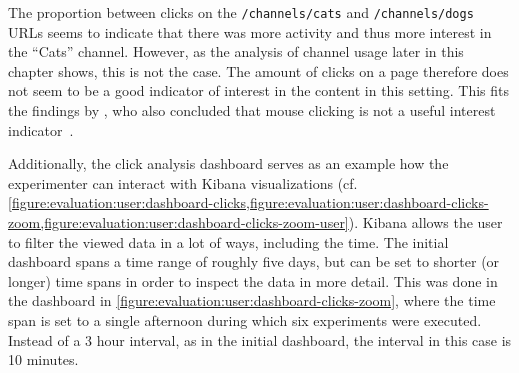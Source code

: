 The proportion between clicks on the \texttt{/channels/cats} and \texttt{/channels/dogs} URLs seems to indicate that there was more activity and thus more interest in the ``Cats'' channel.
However, as the analysis of channel usage later in this chapter shows, this is not the case.
The amount of clicks on a page therefore does not seem to be a good indicator of interest in the content in this setting.
This fits the findings by \cite{Claypool2001}, who also concluded that mouse clicking is not a useful interest indicator~\cite{Claypool2001}.

Additionally, the click analysis dashboard serves as an example how the experimenter can interact with Kibana visualizations (cf. \cref{figure:evaluation:user:dashboard-clicks,figure:evaluation:user:dashboard-clicks-zoom,figure:evaluation:user:dashboard-clicks-zoom-user}).
Kibana allows the user to filter the viewed data in a lot of ways, including the time.
The initial dashboard spans a time range of roughly five days, but can be set to shorter (or longer) time spans in order to inspect the data in more detail.
This was done in the dashboard in \cref{figure:evaluation:user:dashboard-clicks-zoom}, where the time span is set to a single afternoon during which six experiments were executed.
Instead of a 3 hour interval, as in the initial dashboard, the interval in this case is 10 minutes.

